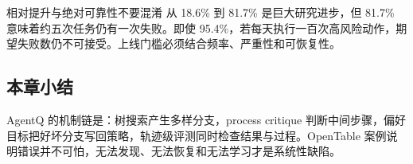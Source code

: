 
\begin{warningbox}{相对提升与绝对可靠性不要混淆}
从 18.6\% 到 81.7\% 是巨大研究进步，但 81.7\% 意味着约五次任务仍有一次失败。即使 95.4\%，若每天执行一百次高风险动作，期望失败数仍不可接受。上线门槛必须结合频率、严重性和可恢复性。
\end{warningbox}

\subsection{本章小结}

AgentQ 的机制链是：树搜索产生多样分支，process critique 判断中间步骤，偏好目标把好坏分支写回策略，轨迹级评测同时检查结果与过程。OpenTable 案例说明错误并不可怕，无法发现、无法恢复和无法学习才是系统性缺陷。

